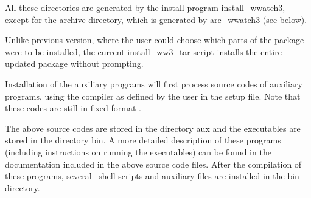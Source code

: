 \noindent
All these directories are generated by the install program {\file
install\_wwatch3}, except for the archive directory, which is generated by
{\file arc\_wwatch3} (see below).

Unlike previous version, where the user could choose which parts of the
package were to be installed, the current {\file install\_ww3\_tar} script
installs the entire updated package without prompting. 

Installation of the auxiliary programs will first process source codes of
auxiliary programs, using the compiler as defined by the user in the setup
file. Note that these codes are still in fixed format .

\begin{flist}


\end{flist}


The above source codes are stored in the directory {\dir aux} and the
executables are stored in the directory {\dir bin}. A more detailed
description of these programs (including instructions on running the
executables) can be found in the documentation included in the above source
code files. After the compilation of these programs, several \unix\ shell
scripts and auxiliary files are installed in the {\dir bin} directory.


